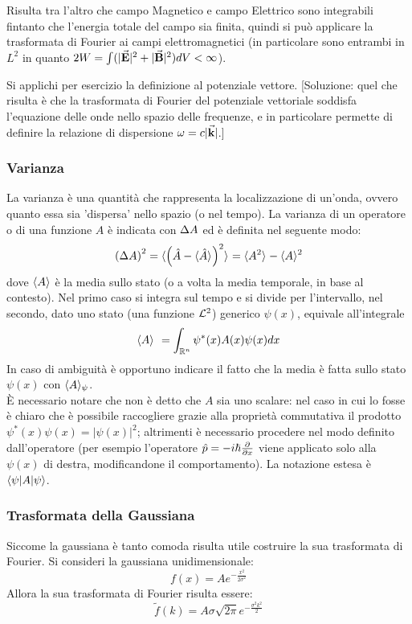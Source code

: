 Risulta tra l'altro che campo Magnetico e campo Elettrico sono integrabili fintanto che l'energia totale del campo sia finita, quindi si può applicare la trasformata di Fourier ai campi elettromagnetici (in particolare sono entrambi in $L^2$ in quanto $2W = \int (|\vect E|^2 + |\vect B|^2) dV < \infty$).

Si applichi per esercizio la definizione al potenziale vettore. [Soluzione: quel che risulta è che la trasformata di Fourier del potenziale vettoriale soddisfa l'equazione delle onde nello spazio delle frequenze, e in particolare permette di definire la relazione di dispersione $\omega = c|\vect k|$.]

\subsubsection*{Varianza} 
La varianza è una quantità che rappresenta la localizzazione di un'onda, ovvero quanto essa sia 'dispersa' nello spazio (o nel tempo). La varianza di un operatore o di una funzione $A$ è indicata con $\var A$ ed è definita nel seguente modo:
\[
	\l\var A\r^2  = \avg{\l \A - \avg \A \r^2} = \avg{A^2} - \avg{A}^2
\]
dove $\avg A$ è la media sullo stato (o a volta la media temporale, in base al contesto). Nel primo caso si integra sul tempo e si divide per l'intervallo, nel secondo, dato uno stato (una funzione $\L^2$) generico $\psi(x)$, equivale all'integrale
\[
	\avg A \ = \rnint \psi^*(x)A(x)\psi(x) dx
\]
In caso di ambiguità è opportuno indicare il fatto che la media è fatta sullo stato $\psi(x)$ con $\avg[\psi] A$.\\
È necessario notare che non è detto che $A$ sia uno scalare: nel caso in cui lo fosse è chiaro che è possibile raccogliere grazie alla proprietà commutativa il prodotto $\psi^*(x)\psi(x) = |\psi(x)|^2$; altrimenti è necessario procedere nel modo definito dall'operatore (per esempio l'operatore $\hat p = -i\hslash\deriv[x]{}$ viene applicato solo alla $\psi(x)$ di destra, modificandone il comportamento). La notazione estesa è $\bra \psi | A | \psi \ket$.

\subsubsection*{Trasformata della Gaussiana} 
Siccome la gaussiana è tanto comoda risulta utile costruire la sua trasformata di Fourier. Si consideri la gaussiana unidimensionale:
\[
	f(x) = A e^{-\frac{x^2}{2 \sigma^2}}
\]
Allora la sua trasformata di Fourier risulta essere:
\[
	\tilde f(k) = A \sigma \sqrt{2 \pi} e^{-\frac{\sigma^2 k^2}{2}}
\]

